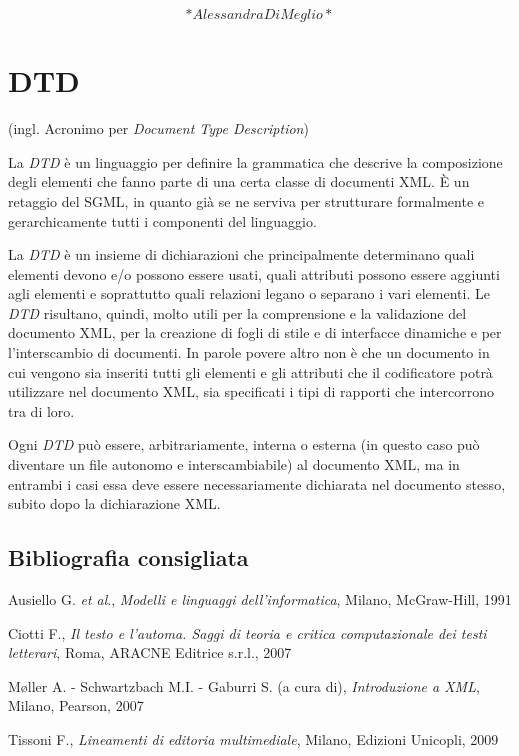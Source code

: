 \documentclass[
  b5paper,
  twoside,
  11pt,
  chapterprefix=false,
  bibliography=totocnumbered,
  listof=flat]{scrbook}
\begin{document}
\[*Alessandra Di Meglio*\]

\hypertarget{dtd}{%
\chapter{DTD}\label{dtd}}

(ingl. Acronimo per \emph{Document Type Description})

La \emph{DTD} è un linguaggio per definire la grammatica che descrive la
composizione degli elementi che fanno parte di una certa classe di
documenti XML. È un retaggio del SGML, in quanto già se ne serviva per
strutturare formalmente e gerarchicamente tutti i componenti del
linguaggio.

La \emph{DTD} è un insieme di dichiarazioni che principalmente determinano
quali elementi devono e/o possono essere usati, quali attributi possono
essere aggiunti agli elementi e soprattutto quali relazioni legano o
separano i vari elementi. Le \emph{DTD} risultano, quindi, molto utili per la
comprensione e la validazione del documento XML, per la creazione di
fogli di stile e di interfacce dinamiche e per l'interscambio di
documenti. In parole povere altro non è che un documento in cui vengono
sia inseriti tutti gli elementi e gli attributi che il codificatore
potrà utilizzare nel documento XML, sia specificati i tipi di rapporti
che intercorrono tra di loro.

Ogni \emph{DTD} può essere, arbitrariamente, interna o esterna (in questo
caso può diventare un file autonomo e interscambiabile) al documento
XML, ma in entrambi i casi essa deve essere necessariamente dichiarata
nel documento stesso, subito dopo la dichiarazione XML.

\hypertarget{bibliografia-consigliata-8}{%
\section*{Bibliografia consigliata}\label{bibliografia-consigliata-8}}

Ausiello G. \emph{et al}., \emph{Modelli e linguaggi dell'informatica}, Milano,
McGraw-Hill, 1991

Ciotti F., \emph{Il testo e l'automa. Saggi di teoria e critica
computazionale dei testi letterari}, Roma, ARACNE Editrice s.r.l., 2007

Møller A. - Schwartzbach M.I. - Gaburri S. (a cura di), \emph{Introduzione a
XML}, Milano, Pearson, 2007

Tissoni F., \emph{Lineamenti di editoria multimediale}, Milano, Edizioni
Unicopli, 2009
\end{document}

